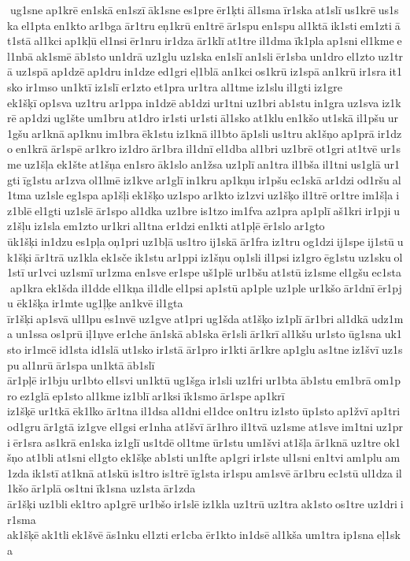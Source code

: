ug1sne ap1krē en1skā en1szī āk1sne es1pre ēr1ķti āl1sma īr1ska at1slī us1krē us1ska el1pta en1kto ar1bga ār1tru eņ1krū en1trē ār1spu en1spu al1ktā ik1sti em1zti āt1stā al1kci ap1kļū el1nsi ēr1nru ir1dza ār1klī at1tre il1dma īk1pla ap1sni el1kme el1nbā ak1smē āb1sto un1drā uz1glu uz1ska en1slī an1sli ēr1sba un1dro el1zto uz1trā uz1spā ap1dzē ap1dru in1dze ed1gri eļ1blā an1kci os1krū iz1spā an1krū ir1sra it1sko ir1mso un1ktī iz1slī er1zto et1pra ur1tra al1tme iz1slu il1gti iz1gre 	ek1šķī op1sva uz1tru ar1ppa in1dzē ab1dzi ur1tni uz1bri ab1stu in1gra uz1sva iz1krē ap1dzi ug1šte um1bru at1dro ir1sti ur1sti āl1sko at1klu en1kšo ut1skā il1pšu ur1gšu ar1knā ap1knu im1bra ēk1stu iz1knā il1bto āp1sli us1tru ak1šņo ap1prā ir1dzo en1krā ār1spē ar1kro iz1dro ār1bra il1dnī el1dba al1bri uz1brē ot1gri at1tvē ur1sme uz1šļa ek1šte at1šņa en1sro āk1slo an1žsa uz1plī an1tra il1bša il1tni us1glā ur1gti īg1stu ar1zva ol1lmē iz1kve ar1glī in1kru ap1kņu ir1pšu ec1skā ar1dzi od1ršu al1tma uz1sle eg1spa ap1šļi ek1šķo uz1spo ar1kto iz1zvi uz1šķo il1trē or1tre im1šļa iz1blē el1gti uz1slē ār1spo al1dka uz1bre is1tzo im1fva az1pra ap1plī aš1kri ir1pji uz1šļu iz1sla em1zto ur1kri al1tna er1dzi en1kti at1pļē ēr1slo ar1gto 	ūk1šķi in1dzu es1pļa oņ1pri uz1bļā us1tro ij1skā ār1fra iz1tru og1dzi ij1spe ij1stū uk1šķi ār1trā uz1kla ek1sče ik1stu ar1ppi iz1šņu oņ1sli il1psi iz1gro ēg1stu uz1sku ol1stī ur1vci uz1smī ur1zma en1sve er1spe uš1plē ur1bšu at1stū iz1sme el1gšu ec1sta ap1kra ek1šda il1dde el1kņa il1dle el1psi ap1stū ap1ple uz1ple ur1kšo ār1dnī ēr1pju 	ēk1šķa ir1mte ug1ļķe an1kvē il1gta 	īr1šķi ap1svā ul1lpu es1nvē uz1gve at1pri ug1šda at1šķo iz1plī ār1bri al1dkā udz1ma un1ssa os1prū iļ1ņve er1che ān1skā ab1ska ēr1sli ār1krī al1kšu ur1sto ūg1sna uk1sto ir1mcē id1sta id1slā ut1sko ir1stā ār1pro ir1kti ār1kre ap1glu as1tne iz1švī uz1spu al1nrū ār1spa un1ktā āb1slī 	ār1pļē ir1bju ur1bto el1svi un1ktū ug1šga ir1sli uz1fri ur1bta āb1stu em1brā om1pro ez1glā ep1sto al1kme iz1blī ar1ksi īk1smo ār1spe ap1krī 	iz1šķē ur1tkā ēk1lko ār1tna il1dsa al1dni el1dce on1tru iz1sto ūp1sto ap1žvī ap1tri od1gru ār1gtā iz1gve el1gsi er1nha at1švī ār1hro il1tvā uz1sme at1sve im1tni uz1pri ēr1sra as1krā en1ska iz1glī us1tdē ol1tme ūr1stu um1švi at1šļa ār1knā uz1tre ok1šņo at1bli at1sni el1gto ek1šķe ab1sti un1fte ap1gri ir1ste ul1sni en1tvi am1plu am1zda ik1stī at1knā at1skū is1tro is1trē īg1sta ir1spu am1svē ār1bru ec1stū ul1dza il1kšo ār1plā os1tni īk1sna uz1sta ār1zda 	ār1šķi uz1bli ek1tro ap1grē ur1bšo ir1slē iz1kla uz1trū uz1tra ak1sto os1tre uz1dri ir1sma 	ak1šķē ak1tli ek1švē ās1nku el1zti er1cba ēr1kto in1dsē al1kša um1tra ip1sna eļ1ska 
